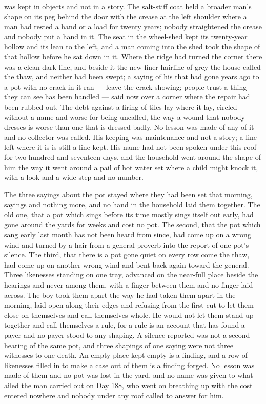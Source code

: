  was kept in objects and not in a story. The salt-stiff coat held a broader man's shape on its peg behind the door with the crease at the left shoulder where a man had rested a hand or a load for twenty years; nobody straightened the crease and nobody put a hand in it. The seat in the wheel-shed kept its twenty-year hollow and its lean to the left, and a man coming into the shed took the shape of that hollow before he sat down in it. Where the  ridge had turned the corner there was a clean dark line, and beside it the new finer hairline of grey the house called the thaw, and neither had been swept; a saying of his that had gone years ago to a pot with no crack in it ran --- leave the crack showing; people trust a thing they can see has been handled --- said now over a corner where the repair had been rubbed out. The debt against a firing of tiles lay where it lay, circled without a name and worse for being uncalled, the way a wound that nobody dresses is worse than one that is dressed badly. No lesson was made of any of it and no collector was called. His keeping was maintenance and not a story; a line left where it is is still a line kept. His name had not been spoken under this roof for two hundred and seventeen days, and the household went around the shape of him the way it went around a pail of hot water set where a child might knock it, with a look and a wide step and no number.

The three sayings about the pot stayed where they had been set that morning, sayings and nothing more, and no hand in the household laid them together. The old one, that a pot which sings before its time mostly sings itself out early, had gone around the yards for weeks and cost no pot. The second, that the pot which sang early last month has not been heard from since, had come up on a wrong wind and turned by a hair from a general proverb into the report of one pot's silence. The third, that there is a pot gone quiet on every row come the thaw, had come up on another wrong wind and bent back again toward the general. Three likenesses standing on one tray, advanced on the near-full place beside the hearings and never among them, with a finger between them and no finger laid across. The boy took them apart the way he had taken them apart in the morning, laid open along their edges and refusing from the first cut to let them close on themselves and call themselves whole. He would not let them stand up together and call themselves a rule, for a rule is an account that has found a payer and no payer stood to any shaping. A silence reported was not a second hearing of the same pot, and three shapings of one saying were not three witnesses to one death. An empty place kept empty is a finding, and a row of likenesses filled in to make a case out of them is a finding forged. No lesson was made of them and no pot was lost in the yard, and no name was given to what ailed the man carried out on Day 188, who went on breathing up  with the cost entered nowhere and nobody under any roof called to answer for him.

